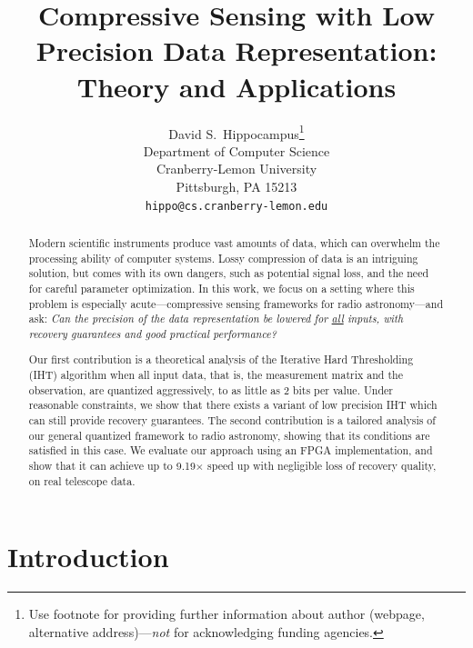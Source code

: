 \documentclass{article}
\title{Compressive Sensing with Low Precision Data Representation: Theory and Applications}%
\author{
  David S.~Hippocampus\thanks{Use footnote for providing further
    information about author (webpage, alternative
    address)---\emph{not} for acknowledging funding agencies.} \\
  Department of Computer Science\\
  Cranberry-Lemon University\\
  Pittsburgh, PA 15213 \\
  \texttt{hippo@cs.cranberry-lemon.edu} \\
}
\begin{document}
\maketitle
\begin{abstract}
\vspace{-1em}
Modern scientific instruments produce vast amounts of data, which can overwhelm the processing ability of computer systems. 
Lossy compression of data is an intriguing solution, 
but comes with its own dangers, such as potential signal loss, and the need for careful parameter optimization. 
In this work, we focus on a setting where this problem is especially acute---compressive sensing frameworks for radio astronomy---and ask: 
{\em Can the precision of the data representation be lowered for \underline{all} 
inputs, with recovery guarantees and good practical performance?}

Our first contribution is a
theoretical analysis of the Iterative Hard 
Thresholding (IHT) algorithm when all input
data, that is, the measurement matrix and the
observation, are quantized aggressively, to as little as 
2 bits per value. 
Under reasonable constraints, 
we show that there exists a variant of low precision IHT which can still provide recovery guarantees. 
The second contribution is a tailored 
analysis of our general quantized framework  
to radio astronomy, showing that its conditions are satisfied in this case. 
We evaluate our approach 
using an FPGA implementation, and show that
it can achieve up to 9.19$\times$ speed up with
negligible loss of recovery quality, on  real telescope data.
\end{abstract}

\vspace{-1em}
\section{Introduction}
\vspace{-1em}
\end{document}

